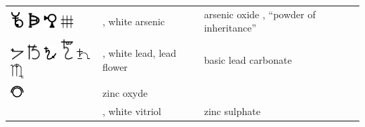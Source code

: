 \documentclass[british,final,landscape]{scrartcl}
\begin{document}
\begin{refsection}
\begin{supertabular}{p{0.3\textwidth}p{0.34\textwidth}p{0.34\textwidth}}
\includegraphics[width=5mm]{Compounds/WhiteArsenic14} \includegraphics[width=5mm]{Compounds/WhiteArsenic15} \includegraphics[width=5mm]{Compounds/WhiteArsenic16} \includegraphics[width=5mm]{Compounds/WhiteArsenic17} & , white arsenic & arsenic oxide  , ``powder of inheritance'' \\
   \includegraphics[width=5mm]{Compounds/WhiteLead} \includegraphics[width=5mm]{Compounds/WhiteLead2} \includegraphics[width=5mm]{Compounds/WhiteLead3} \includegraphics[width=5mm]{Compounds/WhiteLead4} \includegraphics[width=5mm]{Compounds/WhiteLead5} \includegraphics[width=5mm]{Compounds/WhiteLead6} & , white lead, lead flower & basic lead carbonate   \\
   \includegraphics[width=5mm]{Compounds/ZincOxyde} & zinc oxyde & \\
   & , white vitriol & zinc sulphate  \\
 \end{supertabular}


\end{refsection}
\end{document}
